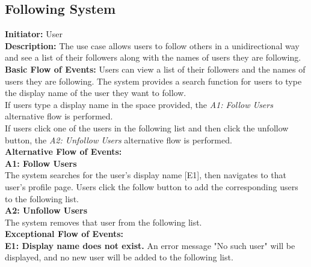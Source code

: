 \documentclass[a4paper,11pt]{scrreprt}
\begin{document}
\begin{figure}[H]
    \centering
    
\end{figure}

\subsection{Following System}
\textbf{\large Initiator: }User\\
\textbf{\large Description: }The use case allows users to follow others in a unidirectional way and see a list of their followers along with the names of users they are following.\\
\textbf{\large Basic Flow of Events: }Users can view a list of their followers and the names of users they are following. The system provides a search function for users to type the display name of the user they want to follow.\\
If users type a display name in the space provided, the \textit{A1: Follow Users} alternative flow is performed.\\
If users click one of the users in the following list and then click the unfollow button, the \textit{A2: Unfollow Users} alternative flow is performed.\\
\textbf{\large Alternative Flow of Events: }\\
\textbf{A1: Follow Users}\\
The system searches for the user's display name [E1], then navigates to that user's profile page. Users click the follow button to add the corresponding users to the following list.\\
\textbf{A2: Unfollow Users}\\
The system removes that user from the following list.\\
\textbf{\large Exceptional Flow of Events:}\\
\textbf{E1: Display name does not exist.} An error message "No such user" will be displayed, and no new user will be added to the following list.\\

\begin{figure}[H]
    \centering
    
\end{figure}
\end{document}
